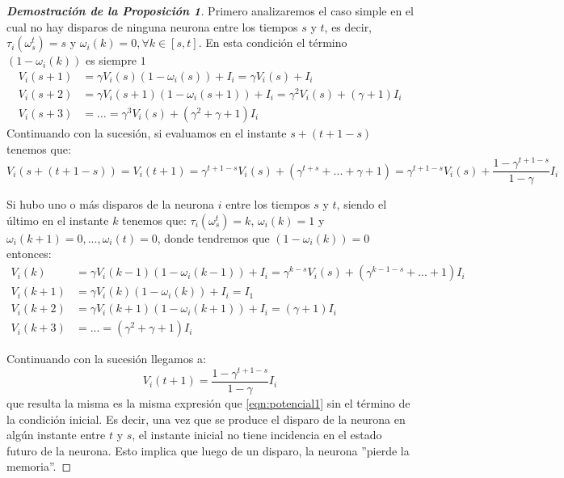 \begin{proof}[\bf{Demostración de la Proposición 1}]
Primero analizaremos el caso simple en el cual no hay disparos de ninguna neurona entre los tiempos $s$ y $t$, es decir, $\tau_i(\omega_s^t)=s$ y $\omega_i(k)=0, \forall k \in [s,t]$. En esta condición el término $(1-\omega_i(k))$ es siempre $1$
\begin{align*}
    V_i(s+1) &= \gamma V_i(s)(1-\omega_i(s)) +I_i = \gamma V_i(s) +I_i\\
    V_i(s+2) &= \gamma V_i(s+1)(1-\omega_i(s+1)) +I_i = \gamma^2 V_i(s) + (\gamma + 1) I_i \\
    V_i(s+3) &= \ldots = \gamma^3 V_i(s) + (\gamma^2+\gamma + 1) I_i
\end{align*}
Continuando con la sucesión, si evaluamos en el instante $s + (t+1-s)$ tenemos que:
\begin{equation}
    V_i(s+(t+1-s)) = V_i(t+1) = \gamma^{t+1-s} V_i(s)+(\gamma^{t+s} +...+\gamma+1)=\gamma^{t+1-s}V_i(s)+\frac{1-\gamma^{t+1-s}}{1-\gamma} I_i
    \label{eqn:potencial1}
\end{equation}

Si hubo uno o más disparos de la neurona $i$ entre los tiempos $s$ y $t$, siendo el último en el instante $k$ tenemos que: $\tau_i(\omega_s^t)=k$, $\omega_i(k)=1$ y $\omega_i(k+1)=0,...,\omega_i(t)=0$, donde tendremos que $(1-\omega_i(k))=0$ entonces:
\begin{align*}
    V_i(k) \ \ \ \ \ &= \gamma V_i(k-1)(1-\omega_i(k-1)) +I_i = \gamma^{k-s} V_i(s) + (\gamma^{k-1-s} + ... + 1) I_i \\
    V_i(k+1) &= \gamma V_i(k)(1-\omega_i(k)) + I_i = I_1\\
    V_i(k+2) &= \gamma V_i(k+1)(1-\omega_i(k+1)) +I_i = (\gamma+1) I_i \\
    V_i(k+3) &= ... = (\gamma^2+\gamma + 1) I_i 
\end{align*}

Continuando con la sucesión llegamos a:
\begin{equation}
    V_i(t+1) = \frac{1-\gamma^{t+1-s}}{1-\gamma} I_i
\end{equation}
que resulta la misma es la misma expresión que \eqref{eqn:potencial1} sin el término de la condición inicial. Es decir, una vez que se produce el disparo de la neurona en algún instante entre $t$ y $s$, el instante inicial no tiene incidencia en el estado futuro de la neurona. Esto implica que luego de un disparo, la neurona ''pierde la memoria''.


\end{proof}
